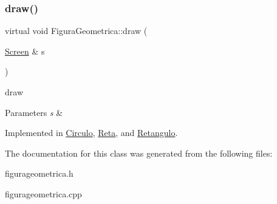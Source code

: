 \subsubsection{\texorpdfstring{draw()}{draw()}}
{\footnotesize\ttfamily virtual void Figura\+Geometrica\+::draw (\begin{DoxyParamCaption}\item[{\hyperlink{classScreen}{Screen} \&}]{s }\end{DoxyParamCaption})\hspace{0.3cm}{\ttfamily [pure virtual]}}



draw 


\begin{DoxyParams}{Parameters}
{\em s} & \\
\hline
\end{DoxyParams}


Implemented in \hyperlink{classCirculo_a593787d6e0618c2eded23e8839e7bea6}{Circulo}, \hyperlink{classReta_ac2e9805183cd474b62bffd8b032cd780}{Reta}, and \hyperlink{classRetangulo_ac088dd6d3f4f3d3f80363a868c2e74f1}{Retangulo}.



The documentation for this class was generated from the following files\+:\begin{DoxyCompactItemize}
\item 
figurageometrica.\+h\item 
figurageometrica.\+cpp\end{DoxyCompactItemize}

